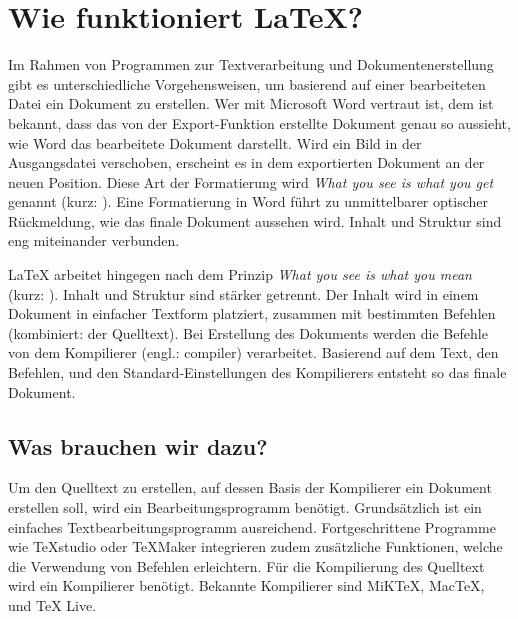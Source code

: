 \section{Wie funktioniert \LaTeX?}
\label{sec:wie_funktioniert_latex_}

Im Rahmen von Programmen zur Textverarbeitung und Dokumentenerstellung gibt es unterschiedliche Vorgehensweisen, um basierend auf einer bearbeiteten Datei ein Dokument zu erstellen. Wer mit Microsoft Word vertraut ist, dem ist bekannt, dass das von der Export-Funktion erstellte Dokument genau so aussieht, wie Word das bearbeitete Dokument darstellt. Wird ein Bild in der Ausgangsdatei verschoben, erscheint es in dem exportierten Dokument an der neuen Position. Diese Art der Formatierung wird \emph{What you see is what you get} genannt (kurz: ). Eine Formatierung in Word führt zu unmittelbarer optischer Rückmeldung, wie das finale Dokument aussehen wird. Inhalt und Struktur sind eng miteinander verbunden.

\LaTeX{} arbeitet hingegen nach dem Prinzip \emph{What you see is what you mean} (kurz: ). Inhalt und Struktur sind stärker getrennt. Der Inhalt wird in einem Dokument in einfacher Textform platziert, zusammen mit bestimmten Befehlen (kombiniert: der Quelltext). Bei Erstellung des Dokuments werden die Befehle von dem Kompilierer (engl.: compiler) verarbeitet. Basierend auf dem Text, den Befehlen, und den Standard-Einstellungen des Kompilierers entsteht so das finale Dokument. 

\subsection{Was brauchen wir dazu?}
\label{sub:was_brauchen_wir_dazu}
Um den Quelltext zu erstellen, auf dessen Basis der Kompilierer ein Dokument erstellen soll, wird ein Bearbeitungsprogramm benötigt. Grundsätzlich ist ein einfaches Textbearbeitungsprogramm ausreichend. Fortgeschrittene Programme wie TeXstudio oder TeXMaker integrieren zudem zusätzliche Funktionen, welche die Verwendung von Befehlen erleichtern.
Für die Kompilierung des Quelltext wird ein Kompilierer benötigt. Bekannte Kompilierer sind MiK\TeX, Mac\TeX, und \TeX{} Live.

